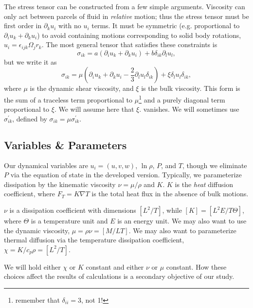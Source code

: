 \documentclass[letterpaper,12pt]{paper}
\newcommand{\lnrho}{\ensuremath{\ln \rho}}
\newcommand{\fast}{\ensuremath{\epsilon_{ijk}}}
\begin{document}
The stress tensor can be constructed from a few simple
arguments. Viscosity can only act between parcels of fluid in
\emph{relative} motion; thus the stress tensor must be first order in
$\partial_k u_i$ with no $u_i$ terms. It must be symmetric
(e.g. proportional to $\partial_i u_k + \partial_k u_i$) to avoid
containing motions corresponding to solid body rotations,
$u_i = \fast \Omega_j r_k$. The most general tensor that satisfies
these constraints is
\begin{equation}
  \label{eq:general_tensor}
  \sigma_{ik} = a (\partial_i u_k + \partial_k u_i) + b \delta_{ik} \partial_l u_l, 
\end{equation}
but we write it as 
\begin{equation}
  \label{eq:stress}
  \sigma_{ik} = \mu \left(\partial_i u_k + \partial_k u_i - \frac{2}{3} \partial_l u_l \delta_{ik}\right) + \xi \delta_l u_l \delta_{ik},
\end{equation}
where $\mu$ is the dynamic shear viscosity, and $\xi$ is the bulk
viscosity. This form is the sum of a traceless term proportional to
$\mu$\footnote{remember that $\delta_{ii} = 3$, not 1!} and a purely
diagonal term proportional to $\xi$. We will assume here that $\xi$.
vanishes. We will sometimes use $\sigma^{'}_{ik}$, defined by
$\sigma_{ik} = \mu \sigma^{'}_{ik}$.

\subsection{Variables \& Parameters}
\label{sec:variables}

Our dynamical variables are $u_i = (u,v,w)$, $\lnrho$, $P$, and $T$,
though we eliminate $P$ via the equation of state in the developed
version. Typically, we parameterize dissipation by the kinematic
viscosity $\nu = \mu /\rho$ and $K$. $K$ is the \emph{heat} diffusion
coefficient, where $F_T = K \nabla T$ is the total heat flux in the
absence of bulk motions. 

$\nu$ is a dissipation coefficient with dimensions
$\left[ L^2/T\right]$, while $[K] = \left[ L^2 E/ T \Theta\right]$,
where $\Theta$ is a temperature unit and $E$ is an energy unit. We may
also want to use the dynamic viscosity,
$\mu = \rho \nu = \left[ M /L T\right]$. We may also want to
parameterize thermal diffusion via the temperature dissipation
coefficient, $\chi = K/c_p \rho = \left[ L^2/T\right]$.

We will hold either $\chi$ or $K$ constant and either $\nu$ or $\mu$
constant. How these choices affect the results of calculations is a
secondary objective of our study.
\end{document}
